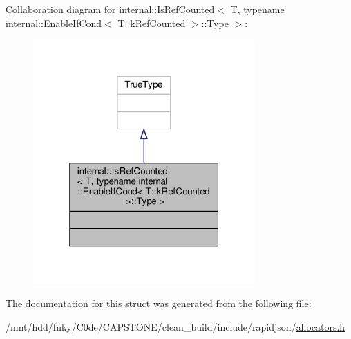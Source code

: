 Collaboration diagram for internal\+:\+:Is\+Ref\+Counted$<$ T, typename internal\+:\+:Enable\+If\+Cond$<$ T\+:\+:k\+Ref\+Counted $>$\+:\+:Type $>$\+:
\nopagebreak
\begin{figure}[H]
\begin{center}
\leavevmode
\includegraphics[width=241pt]{structinternal_1_1IsRefCounted_3_01T_00_01typename_01internal_1_1EnableIfCond_3_01T_1_1kRefCountf78847c2aec804e24d45cd6ee00738d6}
\end{center}
\end{figure}


The documentation for this struct was generated from the following file\+:\begin{DoxyCompactItemize}
\item 
/mnt/hdd/fnky/\+C0de/\+C\+A\+P\+S\+T\+O\+N\+E/clean\+\_\+build/include/rapidjson/\hyperlink{allocators_8h}{allocators.\+h}\end{DoxyCompactItemize}
